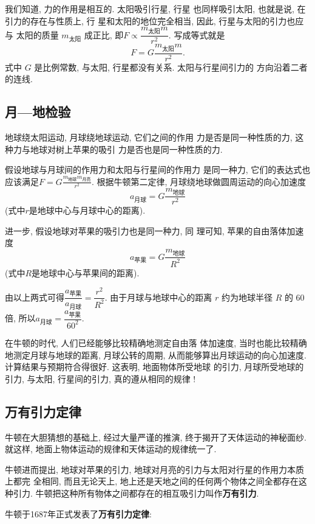 \documentclass[11pt,a4paper]{ctexbook}
\begin{document}
我们知道, 力的作用是相互的. 太阳吸引行星, 行星
也同样吸引太阳, 也就是说, 在引力的存在与性质上, 行
星和太阳的地位完全相当, 因此, 行星与太阳的引力也应与
太阳的质量 $m_\text{太阳}$ 成正比, 即$F \propto \dfrac{m_\text{太阳}m}{r^2}.$
写成等式就是$$F = G\frac{m_\text{太阳}m}{r^2}.$$
式中 $G$ 是比例常数, 与太阳, 行星都没有关系. 太阳与行星间引力的
方向沿着二者的连线.

\subsection{月—地检验}

{\kaishu 地球绕太阳运动, 月球绕地球运动, 它们之间的作用
力是否是同一种性质的力, 这种力与地球对树上苹果的吸引
力是否也是同一种性质的力.}

假设地球与月球间的作用力和太阳与行星间的作用力
是同一种力, 它们的表达式也应该满足$F = G\frac{m_\text{地球}m_\text{月亮}}{r^2}.$
根据牛顿第二定律, 月球绕地球做圆周运动的向心加速度
$$a_\text{月球}= G\frac{m_\text{地球}}{r^2}$$
(式中$r$是地球中心与月球中心的距离).

进一步, 假设地球对苹果的吸引力也是同一种力, 同
理可知, 苹果的自由落体加速度
$$a_\text{苹果}=G\frac{m_\text{地球}}{R^2}$$
(式中$R$是地球中心与苹果间的距离).\vspace{5pt}

由以上两式可得$\dfrac{a_\text{苹果}}{a_\text{月球}} = \dfrac{r^2}{R^2}.$
由于月球与地球中心的距离 $r$ 约为地球半径 $R$ 的 60 倍,
所以$a_\text{月球} = \dfrac{a_\text{苹果}}{60^2}.$\vspace{5pt}

在牛顿的时代, 人们已经能够比较精确地测定自由落
体加速度, 当时也能比较精确地测定月球与地球的距离,
月球公转的周期, 从而能够算出月球运动的向心加速度.
计算结果与预期符合得很好. 这表明, 地面物体所受地球
的引力, 月球所受地球的引力, 与太阳, 行星间的引力,
真的遵从相同的规律 !

\subsection{万有引力定律}

牛顿在大胆猜想的基础上, 经过大量严谨的推演, 终于揭开了天体运动的神秘面纱.
就这样, 地面上物体运动的规律和天体运动的规律统一了.

牛顿进而提出, 地球对苹果的引力, 地球对月亮的引力与太阳对行星的作用力本质上都完
全相同, 而且无论天上, 地上还是天地之间的任何两个物体之间全都存在这种引力.
牛顿把这种所有物体之间都存在的相互吸引力叫作\textbf{万有引力}.

牛顿于1687年正式发表了\textbf{万有引力定律}:
\end{document}
